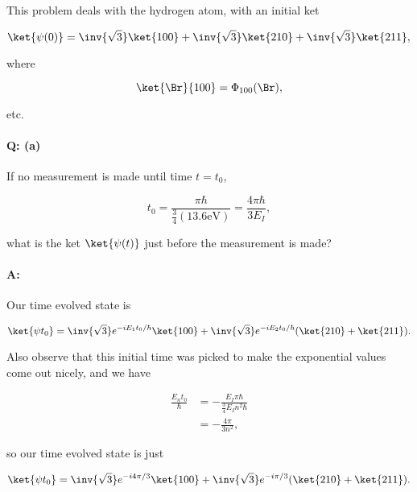 This problem deals with the hydrogen atom, with an initial ket

\begin{equation}\label{eqn:qmIexamPractice2007Dec:4:10}
\ket{\psi(0)} = 
\inv{\sqrt{3}} \ket{100}
+\inv{\sqrt{3}} \ket{210}
+\inv{\sqrt{3}} \ket{211},
\end{equation}

where 

\begin{equation}\label{eqn:qmIexamPractice2007Dec:4:20}
\ket{\Br}{100} = \Phi_{100}(\Br),
\end{equation}

etc.

\paragraph{Q: (a)}

If no measurement is made until time $t = t_0$,

\begin{equation}\label{eqn:qmIexamPractice2007Dec:4:30}
t_0 = \frac{\pi \hbar}{ \frac{3}{4} (13.6 \text{eV}) } = \frac{ 4 \pi \hbar }{ 3 E_I},
\end{equation}

what is the ket $\ket{\psi(t)}$ just before the measurement is made?

\paragraph{A:}

Our time evolved state is 

\begin{equation}\label{eqn:qmIexamPractice2007Dec:4:35}
\ket{\psi{t_0}} = 
\inv{\sqrt{3}} e^{-i E_1 t_0 /\hbar } \ket{100}
+\inv{\sqrt{3}} e^{- i E_2 t_0/\hbar } 
(\ket{210} + \ket{211}).
\end{equation}

Also observe that this initial time was picked to make the exponential values come out nicely, and we have

\begin{align*}
\frac{E_n t_0 }{\hbar} 
&= - \frac{E_I \pi \hbar }{\frac{3}{4} E_I n^2 \hbar} \\
&= - \frac{4 \pi }{ 3 n^2 },
\end{align*}

so our time evolved state is just

\begin{equation}\label{eqn:qmIexamPractice2007Dec:4:100}
\ket{\psi{t_0}} = 
\inv{\sqrt{3}} e^{-i 4 \pi / 3} \ket{100}
+\inv{\sqrt{3}} e^{- i \pi / 3 } 
(\ket{210} + \ket{211}).
\end{equation}

